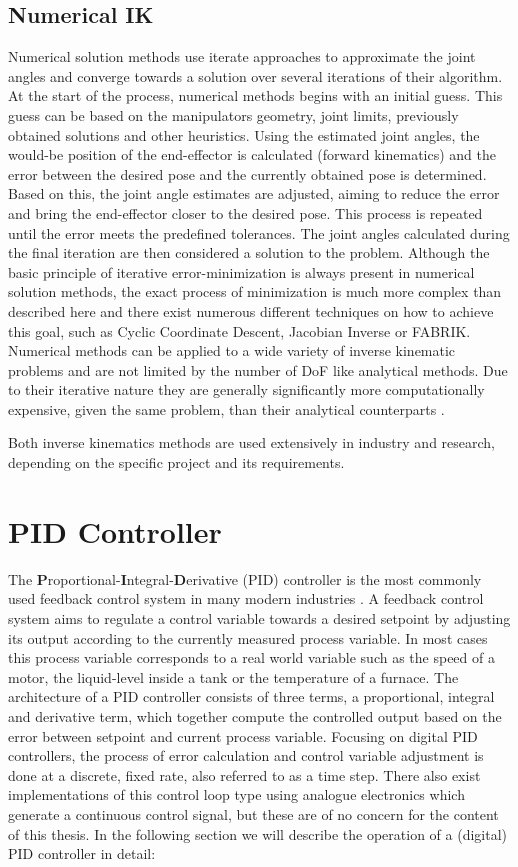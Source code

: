 \subsection{Numerical IK}
Numerical solution methods use iterate approaches to approximate the joint angles and converge towards a solution over several iterations of their algorithm.
At the start of the process, numerical methods begins with an initial guess.
This guess can be based on the manipulators geometry, joint limits, previously obtained solutions and other heuristics.
Using the estimated joint angles, the would-be position of the end-effector is calculated (forward kinematics) and the error between the desired pose and the currently obtained pose is determined.
Based on this, the joint angle estimates are adjusted, aiming to reduce the error and bring the end-effector closer to the desired pose.
This process is repeated until the error meets the predefined tolerances.
The joint angles calculated during the final iteration are then considered a solution to the problem.
Although the basic principle of iterative error-minimization is always present in numerical solution methods, the exact process of minimization is much more complex than described here and there exist numerous different techniques on how to achieve this goal, such as Cyclic Coordinate Descent, Jacobian Inverse or FABRIK. 
Numerical methods can be applied to a wide variety of inverse kinematic problems and are not limited by the number of DoF like analytical methods.
Due to their iterative nature they are generally significantly more computationally expensive, given the same problem, than their analytical counterparts \parencite{aristidou2018inverse, inverseKinematicsIllinois}.

Both inverse kinematics methods are used extensively in industry and research, depending on the specific project and its requirements.


\section{PID Controller}
The \textbf{P}roportional-\textbf{I}ntegral-\textbf{D}erivative (PID) controller is the most commonly used feedback control system in many modern industries \parencite{aastrom2002control}.
A feedback control system aims to regulate a control variable towards a desired setpoint by adjusting its output according to the currently measured process variable.
In most cases this process variable corresponds to a real world variable such as the speed of a motor, the liquid-level inside a tank or the temperature of a furnace.
The architecture of a PID controller consists of three terms, a proportional, integral and derivative term, which together compute the controlled output based on the error between setpoint and current process variable.
Focusing on digital PID controllers, the process of error calculation and control variable adjustment is done at a discrete, fixed rate, also referred to as a time step.
There also exist implementations of this control loop type using analogue electronics which generate a continuous control signal, but these are of no concern for the content of this thesis.
In the following section we will describe the operation of a (digital) PID controller in detail:

